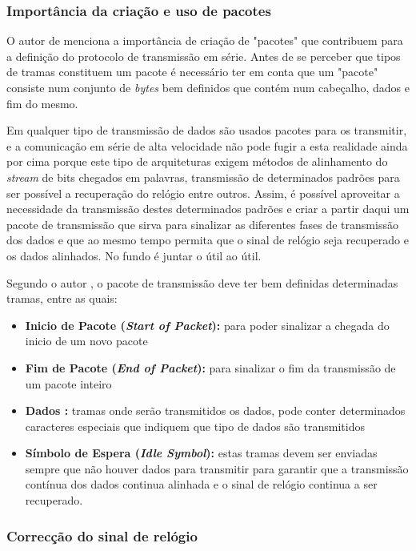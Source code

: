 \subsubsection*{Importância da criação e uso de pacotes}

O autor de \cite{R032} menciona a importância de criação de "pacotes" que contribuem para a definição do protocolo de transmissão em série. Antes de se perceber que tipos de tramas constituem um pacote é necessário ter em conta que um "pacote" consiste num conjunto de \textit{bytes} bem definidos que contém num cabeçalho, dados e fim do mesmo.

Em qualquer tipo de transmissão de dados são usados pacotes para os transmitir, e a comunicação em série de alta velocidade não pode fugir a esta realidade ainda por cima porque este tipo de arquiteturas exigem métodos de alinhamento do \textit{stream} de bits chegados em palavras, transmissão de determinados padrões para ser possível a recuperação do relógio entre outros. Assim, é possível aproveitar a necessidade da transmissão destes determinados padrões e criar a partir daqui um pacote de transmissão que sirva para sinalizar as diferentes fases de transmissão dos dados e que ao mesmo tempo permita que o sinal de relógio seja recuperado e os dados alinhados. No fundo é juntar o útil ao útil.

Segundo o autor \cite{R032}, o pacote de transmissão deve ter bem definidas determinadas tramas, entre as quais:
\begin{itemize}
	\item \textbf{Inicio de Pacote (\textit{Start of Packet}): }para poder sinalizar a chegada do inicio de um novo pacote
	\item \textbf{Fim de Pacote (\textit{End of Packet}):} para sinalizar o fim da transmissão de um pacote inteiro
	\item\textbf{Dados :} tramas onde serão transmitidos os dados, pode conter determinados caracteres especiais que indiquem que tipo de dados são transmitidos
	\item \textbf{Símbolo de Espera (\textit{Idle Symbol}):} estas tramas devem ser enviadas sempre que não houver dados para transmitir para garantir que a transmissão contínua dos dados continua alinhada e o sinal de relógio continua a ser recuperado.
\end{itemize}


\subsubsection*{Correcção do sinal de relógio}
	
